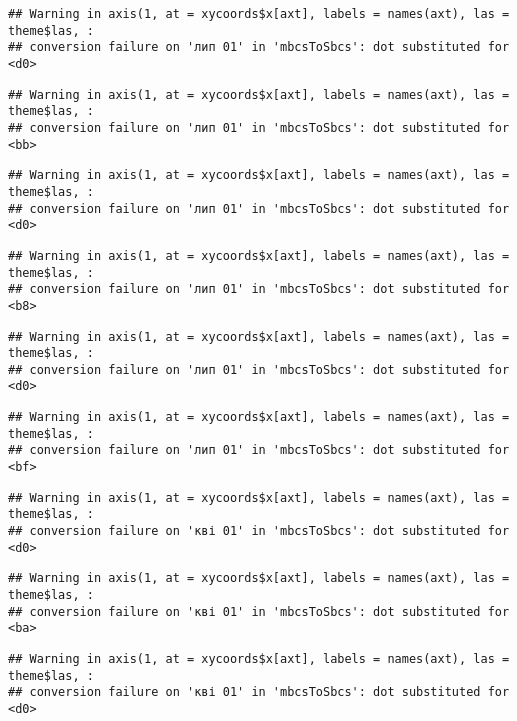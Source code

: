 \documentclass[]{article}
\begin{document}
\begin{verbatim}
## Warning in axis(1, at = xycoords$x[axt], labels = names(axt), las = theme$las, :
## conversion failure on 'лип 01' in 'mbcsToSbcs': dot substituted for <d0>
\end{verbatim}

\begin{verbatim}
## Warning in axis(1, at = xycoords$x[axt], labels = names(axt), las = theme$las, :
## conversion failure on 'лип 01' in 'mbcsToSbcs': dot substituted for <bb>
\end{verbatim}

\begin{verbatim}
## Warning in axis(1, at = xycoords$x[axt], labels = names(axt), las = theme$las, :
## conversion failure on 'лип 01' in 'mbcsToSbcs': dot substituted for <d0>
\end{verbatim}

\begin{verbatim}
## Warning in axis(1, at = xycoords$x[axt], labels = names(axt), las = theme$las, :
## conversion failure on 'лип 01' in 'mbcsToSbcs': dot substituted for <b8>
\end{verbatim}

\begin{verbatim}
## Warning in axis(1, at = xycoords$x[axt], labels = names(axt), las = theme$las, :
## conversion failure on 'лип 01' in 'mbcsToSbcs': dot substituted for <d0>
\end{verbatim}

\begin{verbatim}
## Warning in axis(1, at = xycoords$x[axt], labels = names(axt), las = theme$las, :
## conversion failure on 'лип 01' in 'mbcsToSbcs': dot substituted for <bf>
\end{verbatim}

\begin{verbatim}
## Warning in axis(1, at = xycoords$x[axt], labels = names(axt), las = theme$las, :
## conversion failure on 'кві 01' in 'mbcsToSbcs': dot substituted for <d0>
\end{verbatim}

\begin{verbatim}
## Warning in axis(1, at = xycoords$x[axt], labels = names(axt), las = theme$las, :
## conversion failure on 'кві 01' in 'mbcsToSbcs': dot substituted for <ba>
\end{verbatim}

\begin{verbatim}
## Warning in axis(1, at = xycoords$x[axt], labels = names(axt), las = theme$las, :
## conversion failure on 'кві 01' in 'mbcsToSbcs': dot substituted for <d0>
\end{verbatim}
\end{document}
